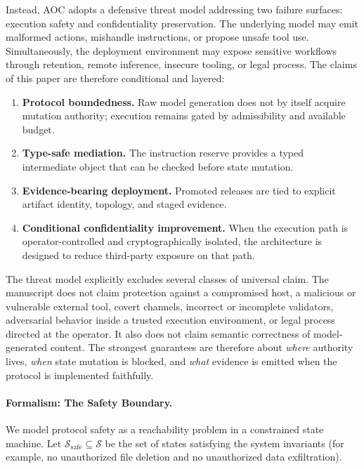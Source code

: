 \documentclass[11pt]{article}
\theoremstyle{remark}
\newcommand{\AOC}{\textup{\textsc{AOC}}}
\begin{document}
Instead, \AOC{} adopts a defensive threat model addressing two failure surfaces: execution safety and confidentiality preservation. The underlying model may emit malformed actions, mishandle instructions, or propose unsafe tool use. Simultaneously, the deployment environment may expose sensitive workflows through retention, remote inference, insecure tooling, or legal process. The claims of this paper are therefore conditional and layered:

\begin{enumerate}
    \item \textbf{Protocol boundedness.} Raw model generation does not by itself acquire mutation authority; execution remains gated by admissibility and available budget.
    \item \textbf{Type-safe mediation.} The instruction reserve provides a typed intermediate object that can be checked before state mutation.
    \item \textbf{Evidence-bearing deployment.} Promoted releases are tied to explicit artifact identity, topology, and staged evidence.
    \item \textbf{Conditional confidentiality improvement.} When the execution path is operator-controlled and cryptographically isolated, the architecture is designed to reduce third-party exposure on that path.
\end{enumerate}

The threat model explicitly excludes several classes of universal claim. The manuscript does not claim protection against a compromised host, a malicious or vulnerable external tool, covert channels, incorrect or incomplete validators, adversarial behavior inside a trusted execution environment, or legal process directed at the operator. It also does not claim semantic correctness of model-generated content. The strongest guarantees are therefore about \emph{where} authority lives, \emph{when} state mutation is blocked, and \emph{what} evidence is emitted when the protocol is implemented faithfully.

\paragraph{Formalism: The Safety Boundary.}
We model protocol safety as a reachability problem in a constrained state machine. Let \(\mathcal{S}_{\mathrm{safe}} \subseteq \mathcal{S}\) be the set of states satisfying the system invariants (for example, no unauthorized file deletion and no unauthorized data exfiltration).
\end{document}
